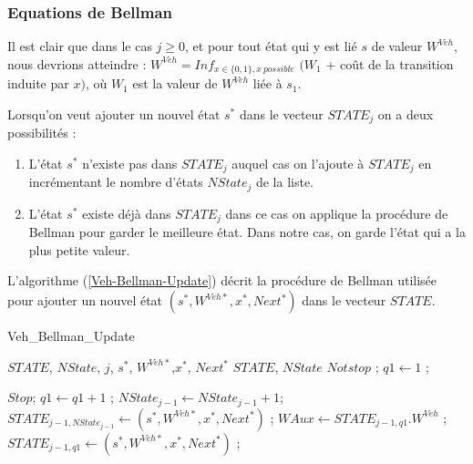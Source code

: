 \subsubsection{Equations de Bellman}
Il est clair que dans le cas $j \geq 0$, et pour tout état qui y est lié $s$ de valeur $W^{Veh}$, nous devrions atteindre :
$W^{Veh} = Inf_{x \in \{0,1\}, x \  possible}$ $(W_1$ + coût de la transition induite par $x)$, où $W_1$ est la valeur de $W^{Veh}$ liée à $s_1$.%


Lorsqu'on veut ajouter un nouvel état $s^*$ dans le vecteur $STATE_j$ on a deux possibilités :
\begin{enumerate}
	\item L'état $s^*$ n'existe pas dans $STATE_j$ auquel cas on l'ajoute à $STATE_j$ en incrémentant le nombre d'états $NState_j$ de la liste.
	\item L'état $s^*$ existe déjà dans $STATE_j$ dans ce cas on applique la procédure de Bellman pour garder le meilleure état. Dans notre cas, on garde l'état qui a la plus petite valeur.
	
\end{enumerate}
L'algorithme (\ref{Veh-Bellman-Update}) décrit la procédure de Bellman utilisée pour ajouter un nouvel état $( s^*, W^{Veh*},x^*, Next^*)$ dans le vecteur $STATE$.

\begin{algorithm} 
	\caption{Veh\_Bellman\_Update}
	\label{Veh-Bellman-Update}
	\begin{algorithmic}[1]
		\REQUIRE $STATE$, $NState$, $j$, $s^*$, $W^{Veh*}$,$x^*$, $Next^*$
		\ENSURE $STATE$, $NState$
		\hline
		\vspace{0.5cm}
		\INITIALISATION
		\STATE$Not stop$ ;
		\STATE $q1 \leftarrow 1$ ;
		\vspace{0.3cm}
		
		\BOUCLEPRINCIPAL
		\vspace{0.2cm}
		\STATE $Stop$;
		\ELSE
		\STATE $q1 \leftarrow q1+1 $ ;
		\ENDIF
		\ENDWHILE
		\STATE $NState_{j-1} \leftarrow NState_{j-1} + 1$;
		\STATE $STATE_{j-1,NState_{j-1}} \leftarrow ( s^*, W^{Veh*},x^*, Next^*) $ ;
		\ELSE 
		\STATE $WAux \leftarrow STATE_{j-1,q1}.W^{Veh}$ ;
		\STATE $STATE_{j-1,q1} \leftarrow ( s^*, W^{Veh*},x^*, Next^*)$ ;
		\ENDIF
		\ENDIF
		
	\end{algorithmic}
\end{algorithm}
